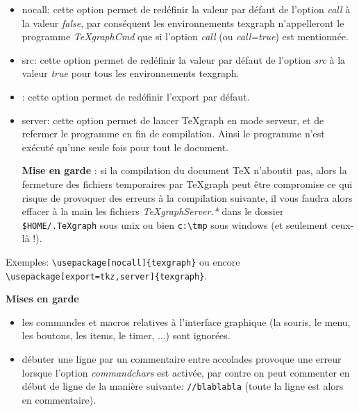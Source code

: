 \begin{itemize}
 \item \textcolor{\coloropt}{nocall}: cette option permet de redéfinir la valeur par défaut de l'option \textit{call} à la valeur \textit{false}, par conséquent les environnements texgraph n'appelleront le programme \textit{TeXgraphCmd} que si l'option \textit{call} (ou \textit{call=true}) est mentionnée.

 \item \textcolor{\coloropt}{src}: cette option permet de redéfinir la valeur par défaut de l'option \textit{src} à la valeur \textit{true} pour tous les environnements texgraph.

 \item {}: cette option permet de redéfinir l'export par défaut.

 \item \textcolor{\coloropt}{server}: cette option permet de lancer TeXgraph en mode serveur, et de refermer le programme en fin de compilation. Ainsi le programme n'est exécuté qu'une seule fois pour tout le document.

\noindent\textbf{Mise en garde} : si la compilation du document \TeX{} n'aboutit pas, alors la fermeture des fichiers temporaires par TeXgraph peut être compromise ce qui risque de provoquer des erreurs à la compilation suivante, il vous faudra alors effacer à la main les fichiers \textit{TeXgraphServer.*} dans le dossier \verb|$HOME/.TeXgraph| sous unix ou bien \verb|c:\tmp| sous windows (et seulement ceux-là !).
\end{itemize}

\medskip

Exemples: \verb|\usepackage[nocall]{texgraph}| ou encore \verb|\usepackage[export=tkz,server]{texgraph}|.

\medskip

\textbf{Mises en garde}
\begin{itemize}
 \item les commandes et macros relatives à l'interface graphique (la souris, le menu, les boutons, les items, le timer, ...) sont ignorées.
 \item débuter une ligne par un commentaire entre accolades provoque une erreur lorsque l'option \textit{commandchars} est activée,  par contre on peut commenter en début de ligne de la manière suivante: \verb|//blablabla| (toute la ligne est alors en commentaire).
\end{itemize}

